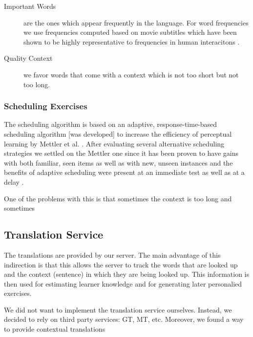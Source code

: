 
\begin{description}

  \item [Important Words] are the ones which appear frequently in the language. For word frequencies we use frequencies computed based on movie subtitles which have been shown to be highly representative to frequencies in human interacitons \cite{New07-subtitles}. 
  
  \item [Quality Context] we favor words that come with a context which is not too short but not too long. 

\end{description}

\subsubsection{Scheduling Exercises}

The scheduling algorithm is based on an adaptive, response-time-based scheduling algorithm [was developed] to increase the efficiency of perceptual learning by Mettler et al. \cite{Mettler14-ARTS}. After evaluating several alternative scheduling strategies we settled on the Mettler one since it has been proven to have gains with both familiar, seen items as well as with new, unseen instances and the benefits of adaptive scheduling were present at an immediate test as well as at a delay \cite{Mettler14-ARTS}.



One of the problems with this is that sometimes the context is too long and sometimes 


\subsection{Translation Service}

The translations are provided by our server. The main advantage of this indirection is that this allows the server to track the words that are looked up and the context (sentence) in which they are being looked up. This information is then used for estimating learner knowledge and for generating later personalied exercises. 

We did not want to implement the translation service ourselves. Instead, we decided to rely on third party services: GT, MT, etc. Moreover, we found a way to provide contextual translations 

